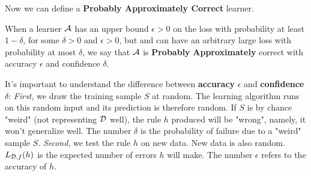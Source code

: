 {Now we can define a {\bf Probably Approximately Correct} learner.
\begin{definition}
	When a learner $\mathcal{A}$ has an upper bound $\epsilon>0$ on the loss with
	probability at least $1-\delta$, for some $\delta>0$ and $\epsilon>0$, 
	but and can have an arbitrary large loss with probability at most
	$\delta$, we say that $\mathcal{A}$ is {\bf Probably} {\bf Approximately} correct with accuracy $\epsilon$ and confidence $\delta$.
\end{definition}




It's important to understand the difference between \textbf{accuracy} $\epsilon$ and \textbf{confidence} $\delta$:
\textit{First}, we draw the training sample $S$ at random. The learning algorithm runs on this random input and its prediction is therefore random.
If $S$ is by chance "weird" (not representing $\mathcal{D}$ well), the rule $h$ produced will be "wrong", namely, it won't generalize well. The number $\delta$ is the probability of failure due to a "weird" sample $S$.
\textit{Second}, we test the rule $h$ on new data. New data is also random. $L_{\mathcal{D},f}(h)$ is the expected number of errors $h$ will make. The number $\epsilon$ refers to the accuracy of $h$.


}
